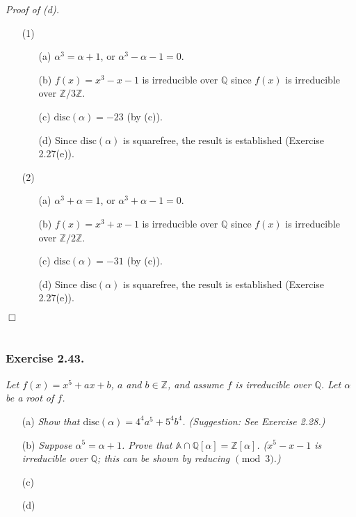 \documentclass{article}
\begin{document}
\emph{Proof of (d).}
\begin{enumerate}
\item[(1)]
  \begin{enumerate}
  \item[(a)]
  $\alpha^3 = \alpha + 1$, or $\alpha^3 - \alpha - 1 = 0$.
  \item[(b)]
  $f(x) = x^3 - x - 1$ is irreducible over $\mathbb{Q}$
  since $f(x)$ is irreducible over $\mathbb{Z}/3\mathbb{Z}$.
  \item[(c)]
  $\text{disc}(\alpha) = -23$ (by (c)).
  \item[(d)]
  Since $\text{disc}(\alpha)$ is squarefree,
  the result is established (Exercise 2.27(e)).
  \end{enumerate}
\item[(2)]
  \begin{enumerate}
  \item[(a)]
  $\alpha^3 + \alpha = 1$, or $\alpha^3 + \alpha - 1 = 0$.
  \item[(b)]
  $f(x) = x^3 + x - 1$ is irreducible over $\mathbb{Q}$
  since $f(x)$ is irreducible over $\mathbb{Z}/2\mathbb{Z}$.
  \item[(c)]
  $\text{disc}(\alpha) = -31$ (by (c)).
  \item[(d)]
  Since $\text{disc}(\alpha)$ is squarefree,
  the result is established (Exercise 2.27(e)).
 \end{enumerate}
\end{enumerate}
$\Box$ \\\\






\subsubsection*{Exercise 2.43.}
\emph{Let $f(x) = x^5+ax+b$, $a$ and $b \in \mathbb{Z}$,
and assume $f$ is irreducible over $\mathbb{Q}$.
Let $\alpha$ be a root of $f$.}
\begin{enumerate}
\item[(a)]
\emph{Show that $\text{disc}(\alpha) = 4^4 a^5 + 5^4 b^4$. (Suggestion: See Exercise 2.28.)}
\item[(b)]
\emph{Suppose $\alpha^5=\alpha+1$.
Prove that $\mathbb{A}\cap\mathbb{Q}[\alpha] = \mathbb{Z}[\alpha]$.
($x^5 - x - 1$ is irreducible over $\mathbb{Q}$;
this can be shown by reducing $\pmod{3}$.)}
\item[(c)]
\emph{}
\item[(d)]
\emph{} \\
\end{enumerate}
\end{document}

